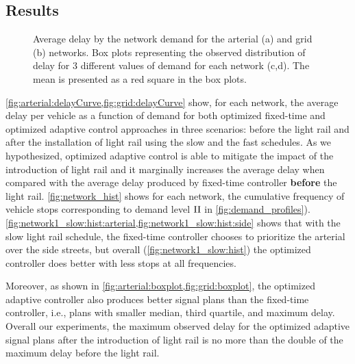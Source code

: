 \subsection{Results}


\begin{figure*}[t]
%
\centering
%
\caption{Average delay by the network demand for the arterial (a) and grid (b)
networks. Box plots representing the observed distribution of delay for 3
different values of demand for each network (c,d). The mean is presented as a
red square in the box plots.}
%
\label{fig:delayCurveAndBoxplot}
%
\end{figure*}


\cref{fig:arterial:delayCurve,fig:grid:delayCurve} show, for each network, the
average delay per vehicle as a function of demand for both optimized fixed-time and
optimized adaptive control approaches in three scenarios: before the light rail and after
the installation of light rail using the slow and the fast schedules.
%
As we hypothesized, optimized adaptive control is able to mitigate the impact of
the introduction of light rail and it marginally increases the average delay
when compared with the average delay produced by fixed-time controller
\textbf{before} the light rail.
%
\cref{fig:network_hist} shows for each network, the cumulative frequency of vehicle stops
corresponding to demand level $\rm II$ in \cref{fig:demand_profiles}).
\cref{fig:network1_slow:hist:arterial,fig:network1_slow:hist:side}
 shows that with the slow light rail schedule, the fixed-time controller chooses to prioritize the arterial over the side
 streets, but overall (\cref{fig:network1_slow:hist}) the optimized controller does better with less stops at all frequencies.
 
%
Moreover, as shown in \cref{fig:arterial:boxplot,fig:grid:boxplot}, the
optimized adaptive controller also produces better signal plans than the
fixed-time controller, i.e., plans with smaller median, third quartile, and
maximum delay.
%
Overall our experiments, the maximum observed delay for the optimized adaptive
signal plans after the introduction of light rail is no more than
%
%
the double of the maximum delay before the light rail.



